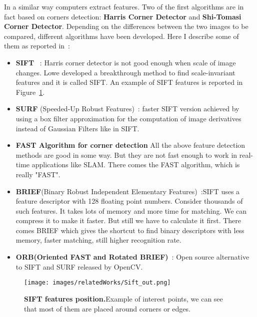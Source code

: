 In a similar way computers extract features. Two of the first algorithms are in fact based on corners detection: 
\textbf{Harris Corner Detector} and \textbf{Shi-Tomasi Corner Detector}.
Depending on the differences between the two images to be compared, different algorithms have been developed. Here I describe 
some of them as reported in~\cite{open_cv}:
\begin{itemize}
    \item \textbf{SIFT} ~\cite{Lowe04_SIFT}: Harris corner detector is not good enough when scale of image changes. Lowe developed a breakthrough 
    method to find scale-invariant features and it is called SIFT. An example of SIFT features is reported in Figure~\ref{fig:sift}.
    \item \textbf{SURF} (Speeded-Up Robust Features)~\cite{BAY_SURF}: faster SIFT version achieved by using a box filter approximation for the computation of image derivatives
    instead of Gaussian Filters like in SIFT.
    \item \textbf{FAST Algorithm for corner detection} All the above feature detection methods are good in some way. But they 
    are not fast enough to work in real-time applications like SLAM. There comes the FAST algorithm, which is really "FAST".
    \item \textbf{BRIEF}(Binary Robust Independent Elementary Features)~\cite{Brief}:SIFT uses a feature descriptor with 128 floating point numbers.
     Consider thousands of such features. It takes lots of memory and more time for matching. We can compress it to make it
    faster. But still we have to calculate it first. There comes BRIEF which gives the shortcut to find binary descriptors with less memory, faster matching, still higher recognition rate.
    \item \textbf{ORB(Oriented FAST and Rotated BRIEF)}~\cite{ORB}: Open source alternative to SIFT and SURF released by OpenCV.
\end{itemize}
\begin{figure}
    \centerline{
    \texttt{[image: images/relatedWorks/Sift\_out.png]}} %
    \caption{\textbf{SIFT features position.}Example of interest points, we can see that most of them are placed around corners or edges.}
    \label{fig:sift}
\end{figure}

